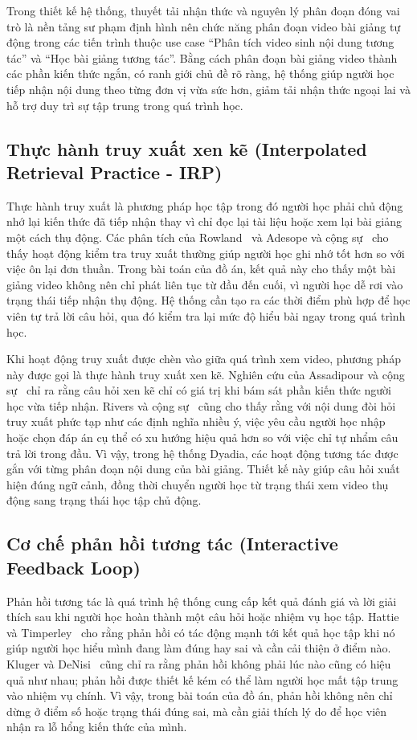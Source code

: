 \documentclass[../DoAn.tex]{subfiles}
\begin{document}
Trong thiết kế hệ thống, thuyết tải nhận thức và nguyên lý phân đoạn đóng vai trò là nền tảng sư phạm định hình nên chức năng phân đoạn video bài giảng tự động trong các tiến trình thuộc use case ``Phân tích video sinh nội dung tương tác'' và ``Học bài giảng tương tác''. Bằng cách phân đoạn bài giảng video thành các phần kiến thức ngắn, có ranh giới chủ đề rõ ràng, hệ thống giúp người học tiếp nhận nội dung theo từng đơn vị vừa sức hơn, giảm tải nhận thức ngoại lai và hỗ trợ duy trì sự tập trung trong quá trình học.

\subsection{Thực hành truy xuất xen kẽ (Interpolated Retrieval Practice - IRP)}
\label{subsection:3.1.2}
Thực hành truy xuất là phương pháp học tập trong đó người học phải chủ động nhớ lại kiến thức đã tiếp nhận thay vì chỉ đọc lại tài liệu hoặc xem lại bài giảng một cách thụ động. Các phân tích của Rowland~\cite{rowland2014effect} và Adesope và cộng sự~\cite{adesope2017rethinking} cho thấy hoạt động kiểm tra truy xuất thường giúp người học ghi nhớ tốt hơn so với việc ôn lại đơn thuần. Trong bài toán của đồ án, kết quả này cho thấy một bài giảng video không nên chỉ phát liên tục từ đầu đến cuối, vì người học dễ rơi vào trạng thái tiếp nhận thụ động. Hệ thống cần tạo ra các thời điểm phù hợp để học viên tự trả lời câu hỏi, qua đó kiểm tra lại mức độ hiểu bài ngay trong quá trình học.

Khi hoạt động truy xuất được chèn vào giữa quá trình xem video, phương pháp này được gọi là thực hành truy xuất xen kẽ. Nghiên cứu của Assadipour và cộng sự~\cite{assadipour2025interpolated} chỉ ra rằng câu hỏi xen kẽ chỉ có giá trị khi bám sát phần kiến thức người học vừa tiếp nhận. Rivers và cộng sự~\cite{rivers2025does} cũng cho thấy rằng với nội dung đòi hỏi truy xuất phức tạp như các định nghĩa nhiều ý, việc yêu cầu người học nhập hoặc chọn đáp án cụ thể có xu hướng hiệu quả hơn so với việc chỉ tự nhẩm câu trả lời trong đầu. Vì vậy, trong hệ thống Dyadia, các hoạt động tương tác được gắn với từng phân đoạn nội dung của bài giảng. Thiết kế này giúp câu hỏi xuất hiện đúng ngữ cảnh, đồng thời chuyển người học từ trạng thái xem video thụ động sang trạng thái học tập chủ động.

\subsection{Cơ chế phản hồi tương tác (Interactive Feedback Loop)}
\label{subsection:3.1.3}
Phản hồi tương tác là quá trình hệ thống cung cấp kết quả đánh giá và lời giải thích sau khi người học hoàn thành một câu hỏi hoặc nhiệm vụ học tập. Hattie và Timperley~\cite{hattie2007power} cho rằng phản hồi có tác động mạnh tới kết quả học tập khi nó giúp người học hiểu mình đang làm đúng hay sai và cần cải thiện ở điểm nào. Kluger và DeNisi~\cite{kluger1996effects} cũng chỉ ra rằng phản hồi không phải lúc nào cũng có hiệu quả như nhau; phản hồi được thiết kế kém có thể làm người học mất tập trung vào nhiệm vụ chính. Vì vậy, trong bài toán của đồ án, phản hồi không nên chỉ dừng ở điểm số hoặc trạng thái đúng sai, mà cần giải thích lý do để học viên nhận ra lỗ hổng kiến thức của mình.
\end{document}
